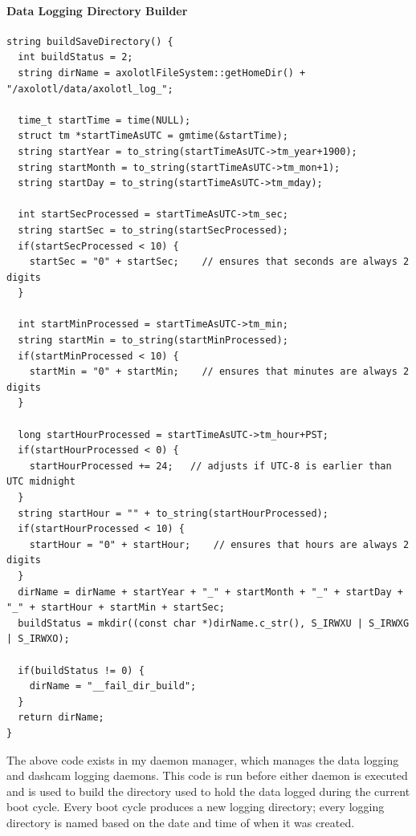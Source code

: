 \documentclass[onecolumn, draftclsnofoot,10pt, compsoc]{IEEEtran}
\begin{document}
\paragraph{Data Logging Directory Builder}
\begin{verbatim}
string buildSaveDirectory() {
  int buildStatus = 2;
  string dirName = axolotlFileSystem::getHomeDir() + "/axolotl/data/axolotl_log_";

  time_t startTime = time(NULL);
  struct tm *startTimeAsUTC = gmtime(&startTime);
  string startYear = to_string(startTimeAsUTC->tm_year+1900);
  string startMonth = to_string(startTimeAsUTC->tm_mon+1);
  string startDay = to_string(startTimeAsUTC->tm_mday);

  int startSecProcessed = startTimeAsUTC->tm_sec;
  string startSec = to_string(startSecProcessed);
  if(startSecProcessed < 10) {
    startSec = "0" + startSec;    // ensures that seconds are always 2 digits
  }

  int startMinProcessed = startTimeAsUTC->tm_min;
  string startMin = to_string(startMinProcessed);
  if(startMinProcessed < 10) {
    startMin = "0" + startMin;    // ensures that minutes are always 2 digits
  }

  long startHourProcessed = startTimeAsUTC->tm_hour+PST;
  if(startHourProcessed < 0) {
    startHourProcessed += 24;   // adjusts if UTC-8 is earlier than UTC midnight
  }
  string startHour = "" + to_string(startHourProcessed);
  if(startHourProcessed < 10) {
    startHour = "0" + startHour;    // ensures that hours are always 2 digits
  }
  dirName = dirName + startYear + "_" + startMonth + "_" + startDay + "_" + startHour + startMin + startSec;
  buildStatus = mkdir((const char *)dirName.c_str(), S_IRWXU | S_IRWXG | S_IRWXO);

  if(buildStatus != 0) {
    dirName = "__fail_dir_build";
  }
  return dirName;
}
\end{verbatim}
\par The above code exists in my daemon manager, which manages the data logging and dashcam logging daemons. This code is run before either daemon is executed and is used to build the directory used to hold the data logged during the current boot cycle. Every boot cycle produces a new logging directory; every logging directory is named based on the date and time of when it was created.
\end{document}
